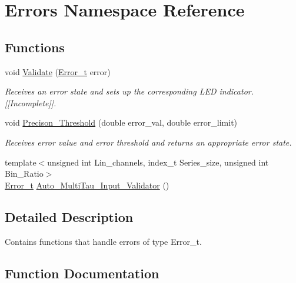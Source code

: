 \hypertarget{namespaceErrors}{}\section{Errors Namespace Reference}
\label{namespaceErrors}
\subsection*{Functions}
\begin{DoxyCompactItemize}
\item 
void \hyperlink{namespaceErrors_a51461dff689e5f46ea124f1e13806c01}{Validate} (\hyperlink{errors_8hpp_a4e8c0d09726859e3d3369c0da5a1aa7f}{Error\+\_\+t} error)
\begin{DoxyCompactList}\small\item\em Receives an error state and sets up the corresponding L\+ED indicator. \mbox{[}\mbox{[}Incomplete\mbox{]}\mbox{]}. \end{DoxyCompactList}\item 
void \hyperlink{namespaceErrors_a0caff7c325638cca6f2f4ebdb0bf81a2}{Precison\+\_\+\+Threshold} (double error\+\_\+val, double error\+\_\+limit)
\begin{DoxyCompactList}\small\item\em Receives error value and error threshold and returns an appropriate error state. \end{DoxyCompactList}\item 
{\footnotesize template$<$unsigned int Lin\+\_\+channels, index\+\_\+t Series\+\_\+size, unsigned int Bin\+\_\+\+Ratio$>$ }\\\hyperlink{errors_8hpp_a4e8c0d09726859e3d3369c0da5a1aa7f}{Error\+\_\+t} \hyperlink{namespaceErrors_a7010d07de8236f9a17b302c78f37483e}{Auto\+\_\+\+Multi\+Tau\+\_\+\+Input\+\_\+\+Validator} ()
\end{DoxyCompactItemize}


\subsection{Detailed Description}
Contains functions that handle errors of type {\ttfamily Error\+\_\+t}. 

\subsection{Function Documentation}
\mbox{\label{namespaceErrors_a7010d07de8236f9a17b302c78f37483e}} 
